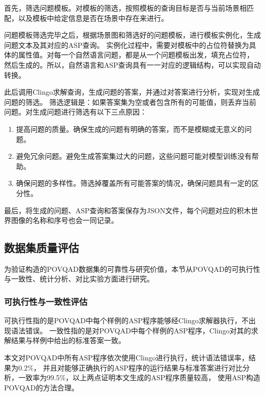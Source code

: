 首先，筛选问题模板。对模板的筛选，按照模板的查询目标是否与当前场景相匹配，以及模板中给定信息是否在场景中存在来进行。

问题模板筛选完毕之后，根据场景图和筛选好的问题模板，进行模板实例化，生成问题文本及其对应的ASP查询。
实例化过程中，需要对模板中的占位符替换为具体的属性值。对每一个自然语言问题，都是从一个问题模板出发，填充占位符，
然后生成的。所以，自然语言和ASP查询具有一一对应的逻辑结构，可以实现自动转换。

此后调用Clingo求解查询，生成问题的答案，并通过对答案进行分析，实现对生成问题的筛选。
筛选逻辑是：如果答案集为空或者包含所有的可能值，则丢弃当前问题。对生成问题进行筛选有以下三点原因：
\begin{enumerate}[nosep]
\item 提高问题的质量。确保生成的问题有明确的答案，而不是模糊或无意义的问题。
\item 避免冗余问题。避免生成答案集过大的问题，这些问题可能对模型训练没有帮助。
\item 确保问题的多样性。筛选掉覆盖所有可能答案的情况，确保问题具有一定的区分性。
\end{enumerate}

最后，将生成的问题、ASP查询和答案保存为JSON文件，每个问题对应的积木世界图像的名称和序号也会一同记录。
\subsection{数据集质量评估}
为验证构造的POVQAD数据集的可靠性与研究价值，本节从POVQAD的可执行性与一致性、统计分析、对比实验方面进行研究。
\subsubsection{可执行性与一致性评估}
可执行性指的是POVQAD中每个样例的ASP程序能够经Clingo求解器执行，不出现语法错误。
一致性指的是对POVQAD中每个样例的ASP程序，Clingo对其的求解结果与样例中给出的标准答案一致。

本文对POVQAD中所有ASP程序依次使用Clingo进行执行，统计语法错误率，结果为0.2\%，
并且对能够正确执行的ASP程序的运行结果与标准答案进行对比分析，一致率为99.5\%，以上两点证明本文生成的ASP程序质量较高，
使用ASP构造POVQAD的方法合理。

